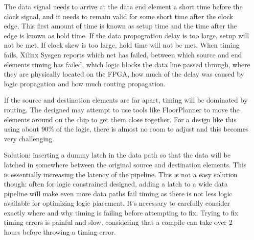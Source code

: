 The data signal needs to arrive at the data end element a short time before the clock signal, and it needs to remain valid for some short time after the clock edge. This first amount of time is known as setup time and the time after the edge is known as hold time. If the data propogration delay is too large, setup will not be met. If clock skew is too large, hold time will not be met.
When timing fails, Xilinx Sysgen reports which net has failed, between which source and end elements timing has failed, which logic blocks the data line passed through, where they are physically located on the FPGA, how much of the delay was caused by logic propagation and how much routing propagation. 

If the source and destination elements are far apart, timing will be dominated by routing. The designed may attempt to use tools like FloorPlanner to move the elements around on the chip to get them close together. For a design like this using about 90\% of the logic, there is almost no room to adjust and this becomes very challenging. 

Solution: inserting a dummy latch in the data path so that the data will be latched in somewhere between the original source and destination elements. This is essentially increasing the latency of the pipeline. This is not a easy solution though: often for logic constrained designed, adding a latch to a wide data pipeline will make even more data paths fail timing as there is not less logic available for optimizing logic placement. It's necessary to carefully consider exactly where and why timing is failing before attempting to fix. Trying to fix timing errors is painful and slow, considering that a compile can take over 2 hours before throwing a timing error. 





